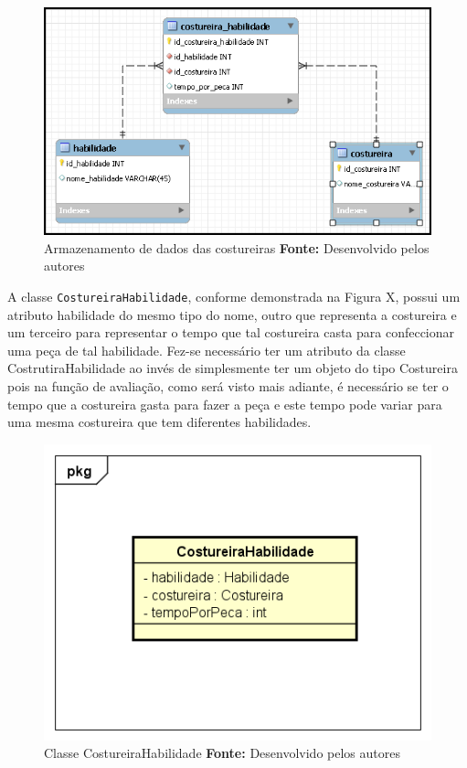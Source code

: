 \begin{figure}[h!]
	\centerline{\includegraphics[scale=0.9]{./imagens/costureira_habilidade_tabela.png}}
	\caption[Tabela costureira-habilidade]
	{Armazenamento de dados das costureiras \textbf{Fonte:} Desenvolvido pelos autores}
	\label{fig:exemplo1}
\end{figure}


\par A classe \texttt{CostureiraHabilidade}, conforme demonstrada na Figura X, possui um atributo habilidade do mesmo tipo do nome, 
outro que representa a costureira e um terceiro para representar o tempo que tal costureira casta para confeccionar uma peça de tal
habilidade. Fez-se necessário ter um atributo da classe CostrutiraHabilidade ao invés de simplesmente ter um objeto do tipo Costureira
pois na função de avaliação, como será visto mais adiante, é necessário se ter o tempo que a costureira gasta para fazer a peça e este
tempo pode variar para uma mesma costureira que tem diferentes habilidades. 


\begin{figure}[h!]
	\centerline{\includegraphics[scale=0.9]{./imagens/costureiraHabilidade_class.png}}
	\caption[Classe CostureiraHabilidade]
	{Classe CostureiraHabilidade \textbf{Fonte:} Desenvolvido pelos autores}
	\label{fig:exemplo1}
\end{figure}


